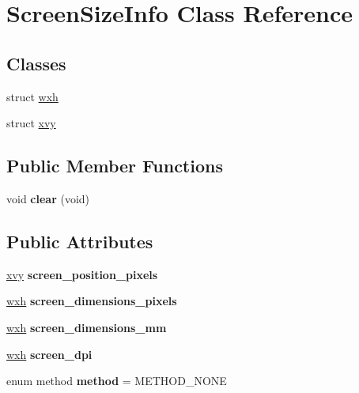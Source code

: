 \hypertarget{classScreenSizeInfo}{\section{Screen\-Size\-Info Class Reference}
\label{classScreenSizeInfo}
}
\subsection*{Classes}
\begin{DoxyCompactItemize}
\item 
struct \hyperlink{structScreenSizeInfo_1_1wxh}{wxh}
\item 
struct \hyperlink{structScreenSizeInfo_1_1xvy}{xvy}
\end{DoxyCompactItemize}
\subsection*{Public Member Functions}
\begin{DoxyCompactItemize}
\item 
\hypertarget{classScreenSizeInfo_aa0eff309e043f47a819db7f357007a74}{void {\bfseries clear} (void)}\label{classScreenSizeInfo_aa0eff309e043f47a819db7f357007a74}

\end{DoxyCompactItemize}
\subsection*{Public Attributes}
\begin{DoxyCompactItemize}
\item 
\hypertarget{classScreenSizeInfo_a5cef747ac327220c235345c52c9cba05}{\hyperlink{structScreenSizeInfo_1_1xvy}{xvy} {\bfseries screen\-\_\-position\-\_\-pixels}}\label{classScreenSizeInfo_a5cef747ac327220c235345c52c9cba05}

\item 
\hypertarget{classScreenSizeInfo_ac42ff4475e23dbf92bca2c0ea9d2603b}{\hyperlink{structScreenSizeInfo_1_1wxh}{wxh} {\bfseries screen\-\_\-dimensions\-\_\-pixels}}\label{classScreenSizeInfo_ac42ff4475e23dbf92bca2c0ea9d2603b}

\item 
\hypertarget{classScreenSizeInfo_afe19e45bf6dd0785c5b4bd7db2f57570}{\hyperlink{structScreenSizeInfo_1_1wxh}{wxh} {\bfseries screen\-\_\-dimensions\-\_\-mm}}\label{classScreenSizeInfo_afe19e45bf6dd0785c5b4bd7db2f57570}

\item 
\hypertarget{classScreenSizeInfo_a5e130e26e512ad843178a620246efcde}{\hyperlink{structScreenSizeInfo_1_1wxh}{wxh} {\bfseries screen\-\_\-dpi}}\label{classScreenSizeInfo_a5e130e26e512ad843178a620246efcde}

\item 
\hypertarget{classScreenSizeInfo_a727dd1a26961b8cc5dd3856604c8fa35}{enum method {\bfseries method} = M\-E\-T\-H\-O\-D\-\_\-\-N\-O\-N\-E}\label{classScreenSizeInfo_a727dd1a26961b8cc5dd3856604c8fa35}

\end{DoxyCompactItemize}


